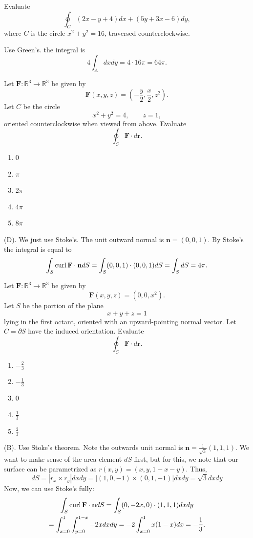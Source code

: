 \begin{exercise}
Evaluate
\[
\oint_C (2x-y+4) dx+(5y+3x-6) dy,
\]
where $C$ is the circle $x^2+y^2=16$, traversed counterclockwise.
\end{exercise}
\begin{solution}
Use Green's. the integral is 
\[
4\int_A dxdy = 4 \cdot 16\pi = 64 \pi.
\]
\end{solution}


\begin{exercise}
Let $\mathbf{F}:\mathbb{R}^3\to\mathbb{R}^3$
be given by
\[
\mathbf{F}(x,y,z)
=
\left(-\frac y2,\frac x2,z^2\right).
\]
Let $C$ be the circle
\[
x^2+y^2=4,\qquad z=1,
\]
oriented counterclockwise when viewed from above. Evaluate
\[
\oint_C\mathbf{F}\cdot d\mathbf{r}.
\]
\begin{enumerate}[label=(\Alph*)]
\item $0$
\item $\pi$
\item $2\pi$
\item $4\pi$
\item $8\pi$
\end{enumerate}
\end{exercise}
\begin{solution}
(D). We just use Stoke's. The unit outward normal is $\mathbf{n} = (0,0,1)$. By Stoke's 
the integral is equal to 
\[
\int_S \operatorname{curl} \mathbf{F} \cdot \mathbf{n} dS 
= \int_S (0,0,1) \cdot (0,0,1) dS = \int_S dS = 4\pi.
\]
\end{solution}

\begin{exercise}
Let $\mathbf{F}:\mathbb{R}^3\to\mathbb{R}^3$
be given by
\[
\mathbf{F}(x,y,z)=(0,0,x^2).
\]
Let $S$ be the portion of the plane
\[
x+y+z=1
\]
lying in the first octant, oriented with an upward-pointing normal vector.
Let $C=\partial S$ have the induced orientation. Evaluate
\[
\oint_C\mathbf{F}\cdot d\mathbf{r}.
\]
\begin{enumerate}[label=(\Alph*)]
\item $-\frac23$
\item $-\frac13$
\item $0$
\item $\frac13$
\item $\frac23$
\end{enumerate}
\end{exercise}
\begin{solution}
(B). Use Stoke's theorem. Note the outwards unit normal is $\mathbf{n} = \frac{1}{\sqrt{3}}(1,1,1)$. 
We want to make sense of the area element $dS$ first, but for this, we note that our surface can be 
parametrized as $r(x,y) = (x,y, 1 - x - y)$. Thus,
\[
dS = |r_x \times r_y| dx dy = |(1,0,-1) \times (0,1,-1)|dxdy = \sqrt{3}dxdy
\]
Now, we can use Stoke's fully:
\begin{multline*}
\int_S \operatorname{curl}\mathbf{F} \cdot \mathbf{n} dS
=\int_S (0,-2x,0)\cdot(1,1,1) dxdy
\\
= \int_{x = 0}^1 \int_{y = 0}^{1-x} -2x dxdy
= -2\int_{x = 0}^1 x(1-x) dx 
= -\frac{1}{3}.
\end{multline*}
\end{solution}

